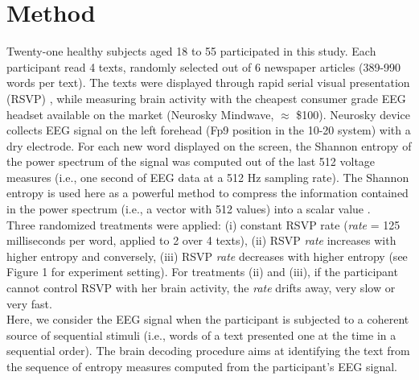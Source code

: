 \section*{Method}
\label{method}

Twenty-one healthy subjects aged 18 to 55 participated in this study. Each participant read 4 texts, randomly selected out of 6 newspaper articles (389-990 words per text). The texts were displayed through rapid serial visual presentation (RSVP) \cite{potter1984rapid,potter1975time}, while measuring brain activity with the cheapest consumer grade EEG headset available on the market (Neurosky Mindwave,  $\approx$ \$100). Neurosky device collects EEG signal on the left forehead (Fp9 position in the 10-20 system) with a dry electrode. For each new word displayed on the screen, the Shannon entropy of the power spectrum of the signal \cite{Tellenbach2009Beyond} was computed out of the last 512 voltage measures (i.e., one second of EEG data at a 512 Hz sampling rate). The Shannon entropy is used here as a powerful method to compress the information contained in the power spectrum (i.e., a vector with 512 values) into a scalar value \cite{ornstein1993entropy}.  \\

Three randomized treatments were applied:  (i) constant RSVP rate ({\it rate} = 125 milliseconds per word, applied to 2 over 4 texts), (ii) RSVP {\it rate}  increases with higher entropy and conversely, (iii) RSVP {\it rate}  decreases with higher entropy (see Figure 1 for experiment setting). For treatments (ii) and (iii), if the participant cannot control RSVP with her brain activity, the {\it rate} drifts away, very slow or very fast.\\

Here, we consider the EEG signal when the participant is subjected to a coherent source of sequential stimuli (i.e., words of a text presented one at the time in a sequential order). The brain decoding procedure aims at identifying the text from the sequence of entropy measures computed from the participant's EEG signal.\\

